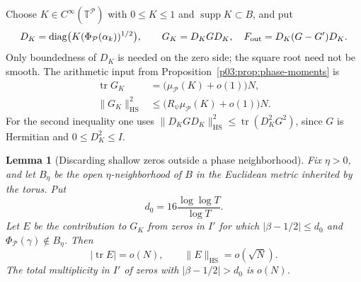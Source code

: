 \documentclass[11pt,letterpaper]{article}
\newtheorem{lemma}[theorem]{Lemma}
\theoremstyle{definition}
\theoremstyle{remark}
\newcommand{\T}{\mathbb T}
\newcommand{\1}{\mathbf 1}
\begin{document}
Choose $K\in C^\infty(\T^{\mathcal P})$ with
$0\le K\le1$ and $\operatorname{supp}K\subset B$, and put
\[
 D_K=\operatorname{diag}
 \bigl(K(\Phi_{\mathcal P}(\alpha_k))^{1/2}\bigr),
 \qquad G_K=D_KGD_K,\quad F_{\rm out}=D_K(G-G')D_K.
\]
Only boundedness of $D_K$ is needed on the zero side; the square root
need not be smooth.  The arithmetic input from
Proposition~\ref{p03:prop:phase-moments} is
\begin{align}
 \operatorname{tr}G_K
   &=\bigl(\mu_{\mathcal P}(K)+o(1)\bigr)N,
   \label{p03:eq:phase-localized-trace}\\
 \|G_K\|_{\mathrm{HS}}^2
   &\le\bigl(R_\psi\mu_{\mathcal P}(K)+o(1)\bigr)N.
   \label{p03:eq:phase-localized-hs}
\end{align}
For the second inequality one uses
$\|D_KGD_K\|_{\mathrm{HS}}^2
\le\operatorname{tr}(D_K^2G^2)$, since $G$ is Hermitian and
$0\le D_K^2\le I$.

\begin{lemma}[Discarding shallow zeros outside a phase neighborhood]
\label{p03:lem:phase-shallow-tail}
Fix $\eta>0$, and let $B_\eta$ be the open $\eta$-neighborhood of $B$
in the Euclidean metric inherited by the torus.  Put
\[
 d_0=16\frac{\log\log T}{\log T}.
\]
Let $E$ be the contribution to $G_K$ from zeros in $I'$ for which
$|\beta-1/2|\le d_0$ and
$\Phi_{\mathcal P}(\gamma)\notin B_\eta$.  Then
\[
 |\operatorname{tr}E|=o(N),\qquad
 \|E\|_{\mathrm{HS}}=o(\sqrt N).
\]
The total multiplicity in $I'$ of zeros with
$|\beta-1/2|>d_0$ is $o(N)$.
\end{lemma}
\end{document}
